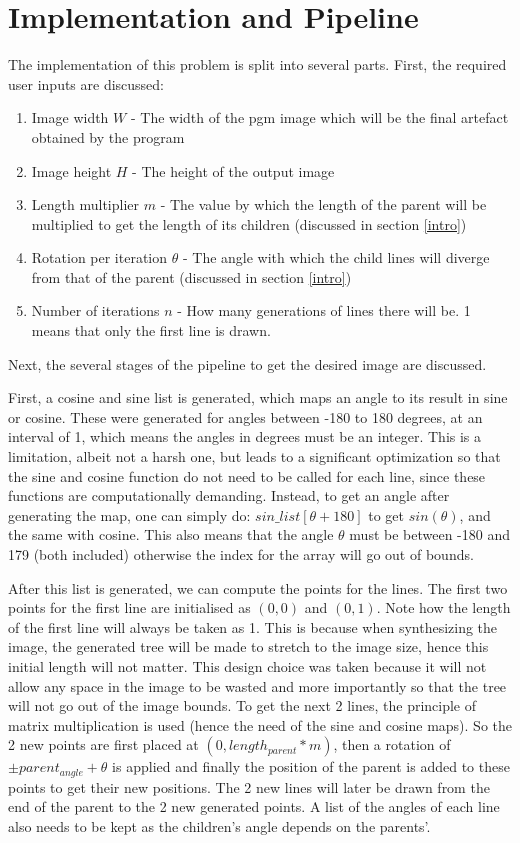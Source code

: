 \section{Implementation and Pipeline}
The implementation of this problem is split into several parts. First, the required user inputs are discussed:
\begin{enumerate}
	\item Image width $W$ - The width of the pgm image which will be the final artefact obtained by the program
	\item Image height $H$ - The height of the output image
	\item Length multiplier $m$ - The value by which the length of the parent will be multiplied to get the length of its children (discussed in section \ref{intro})
	\item Rotation per iteration $\theta$ - The angle with which the child lines will diverge from that of the parent (discussed in section \ref{intro})
	\item Number of iterations $n$ - How many generations of lines there will be. 1 means that only the first line is drawn.
\end{enumerate}
Next, the several stages of the pipeline to get the desired image are discussed.

First, a cosine and sine list is generated, which maps an angle to its result in sine or cosine. These were generated for angles between -180 to 180 degrees, at an interval of 1, which means the angles in degrees must be an integer. This is a limitation, albeit not a harsh one, but leads to a significant optimization so that the sine and cosine function do not need to be called for each line, since these functions are computationally demanding. Instead, to get an angle after generating the map, one can simply do: $sin\_list[\theta + 180]$ to get $sin(\theta)$, and the same with cosine. This also means that the angle $\theta$ must be between -180 and 179 (both included) otherwise the index for the array will go out of bounds.

After this list is generated, we can compute the points for the lines. The first two points for the first line are initialised as $(0, 0)$ and $(0, 1)$. Note how the length of the first line will always be taken as 1. This is because when synthesizing the image, the generated tree will be made to stretch to the image size, hence this initial length will not matter. This design choice was taken because it will not allow any space in the image to be wasted and more importantly so that the tree will not go out of the image bounds. To get the next 2 lines, the principle of matrix multiplication is used (hence the need of the sine and cosine maps). So the 2 new points are first placed at $(0, length_{parent} * m)$, then a rotation of $\pm parent_{angle} + \theta$ is applied and finally the position of the parent is added to these points to get their new positions. The 2 new lines will later be drawn from the end of the parent to the 2 new generated points. A list of the angles of each line also needs to be kept as the children's angle depends on the parents'.


